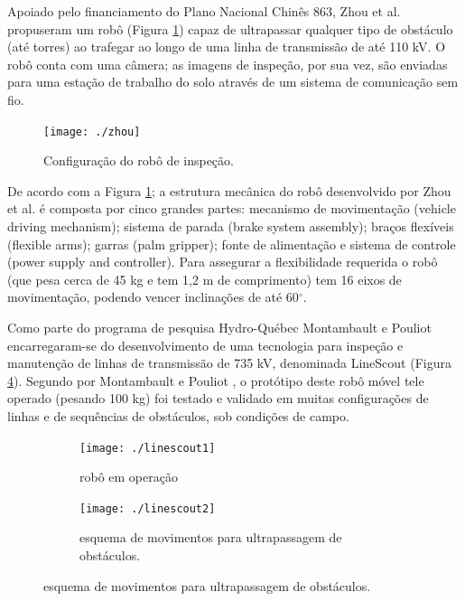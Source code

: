 Apoiado pelo financiamento do Plano Nacional Chinês 863, Zhou et al. \cite{zhou2005control} propuseram um robô (Figura \ref{img:zhou}) capaz de ultrapassar qualquer tipo de obstáculo (até torres) ao trafegar ao longo de uma linha de transmissão de até 110 kV. O robô conta com uma câmera; as imagens de inspeção, por sua vez, são enviadas para uma estação de trabalho do solo através de um sistema de comunicação sem fio.  

\begin{figure} [h!]	
	\caption{Configuração do robô de inspeção.}
	\label{img:zhou}											 
	\centering													 
	\texttt{[image: ./zhou]}
\end{figure}													 

De acordo com a Figura \ref{img:zhou}; a estrutura mecânica do robô desenvolvido por Zhou et al. \cite{zhou2005control} é composta por cinco grandes partes: mecanismo de movimentação (vehicle driving mechanism); sistema de parada (brake system assembly); braços flexíveis (flexible arms); garras (palm gripper); fonte de alimentação e sistema de controle (power supply and controller). Para assegurar a flexibilidade requerida o robô (que pesa cerca de 45 kg e tem 1,2 m de comprimento) tem 16 eixos de movimentação, podendo vencer inclinações de até 60$^{\circ}$. 

Como parte do programa de pesquisa Hydro-Québec Montambault e Pouliot \cite{montambault2007design} encarregaram-se do desenvolvimento de uma tecnologia para inspeção e manutenção de linhas de transmissão de 735 kV, denominada LineScout (Figura \ref{fig:linescout}). Segundo por Montambault e Pouliot \cite{montambault2007design}, o protótipo deste robô móvel tele operado (pesando 100 kg) foi testado e validado em muitas configurações de linhas e de sequências de obstáculos, sob condições de campo.

\begin{figure}[h!]
		\caption{Robô LineScout.}
		\begin{subfigure}[b]{0.5\textwidth}
		  	\centering
		  	\texttt{[image: ./linescout1]} 
		  	\caption{robô em operação}
		  	\label{fig:linescout1}
		\end{subfigure} 
		\begin{subfigure}[b]{0.5\textwidth}
		  	\centering
		  	\texttt{[image: ./linescout2]} 
		  	\caption{esquema de movimentos para ultrapassagem de obstáculos.}
		  	\label{fig:linescout2}
		\end{subfigure} 
	  \label{fig:linescout}
\end{figure}

